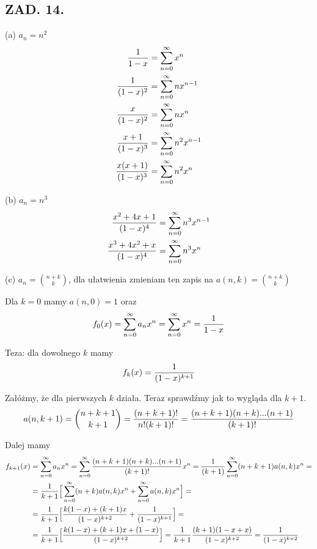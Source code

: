 \documentclass{article}[13pt]
\begin{document}

\subsection*{ZAD. 14.}

{\color{acc}(a)} $a_n=n^2$
\begin{align*}
    {1\over 1-x}&=\sum\limits_{n=0}^\infty x^n\\
    {1\over(1-x)^2}&=\sum\limits_{n=0}^\infty nx^{n-1}\\
    {x\over(1-x)^2}&=\sum\limits_{n=0}^\infty nx^n\\
    {x+1\over(1-x)^3}&=\sum\limits_{n=0}^\infty n^2x^{n-1}\\
    {x(x+1)\over(1-x)^3}&=\sum\limits_{n=0}^\infty n^2x^n
\end{align*}

{\color{acc}(b)} $a_n=n^3$
\begin{align*}
    {x^2+4x+1\over(1-x)^4}&=\sum\limits_{n=0}^\infty n^3x^{n-1}\\
    {x^3+4x^2+x\over (1-x)^4}&=\sum\limits_{n=0}^\infty n^3x^n
\end{align*}

{\color{acc}(c)} $a_n={n+k\choose k}$, dla ułatwienia zmieniam ten zapis na $a(n,k)={n+k\choose k}$
\medskip

Dla $k=0$ mamy $a(n,0)=1$ oraz
$$f_0(x)=\sum\limits_{n=0}^\infty a_nx^n=\sum\limits_{n=0}^\infty x^n={1\over 1-x}$$

Teza: dla dowolnego $k$ mamy
$$f_k(x)={1\over(1-x)^{k+1}}$$

Załóżmy, że dla pierwszych $k$ działa. Teraz sprawdźmy jak to wygląda dla $k+1$. 
$$a(n, k+1)={n+k+1\choose k+1}={(n+k+1)!\over n!(k+1)!}={(n+k+1)(n+k)...(n+1)\over (k+1)!}$$

Dalej mamy
\begin{align*}
    f_{k+1}(x)&=\sum\limits_{n=0}^\infty a_nx^n=\sum\limits_{n=0}^\infty{(n+k+1)(n+k)...(n+1)\over (k+1)!}x^n={1\over(k+1)}\sum\limits_{n=0}^\infty(n+k+1)a(n, k)x^n=\\
    &=\frac1{k+1}\Big[\sum\limits_{n=0}^\infty(n+k)a(n, k)x^n+\sum\limits_{n=0}^\infty a(n, k)x^n\Big]=\\
    &={1\over k+1}\Big[{k(1-x)+(k+1)x\over(1-x)^{k+2}}+{1\over(1-x)^{k+1}}\Big]=\\
    &={1\over k+1}\Big[{k(1-x)+(k+1)x+(1-x)\over (1-x)^{k+2}}\Big]=\frac1{k+1}{(k+1)(1-x+x)\over(1-x)^{k+2}}={1\over(1-x)^{k+2}}
\end{align*}
\end{document}
